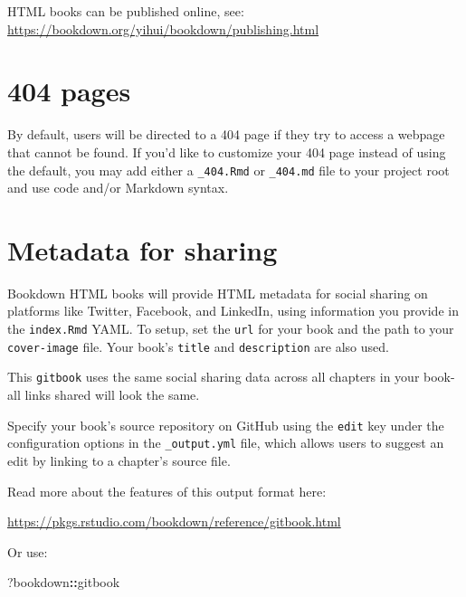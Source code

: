 \documentclass[
]{book}
\newenvironment{Shaded}{\begin{snugshade}}{\end{snugshade}}
\newcommand{\NormalTok}[1]{#1}
\newcommand{\SpecialCharTok}[1]{\textcolor[rgb]{0.81,0.36,0.00}{\textbf{#1}}}
\theoremstyle{definition}
\theoremstyle{definition}
\theoremstyle{definition}
\theoremstyle{definition}
\theoremstyle{remark}
\begin{document}
HTML books can be published online, see: \url{https://bookdown.org/yihui/bookdown/publishing.html}

\section{404 pages}\label{pages}

By default, users will be directed to a 404 page if they try to access a webpage that cannot be found. If you'd like to customize your 404 page instead of using the default, you may add either a \texttt{\_404.Rmd} or \texttt{\_404.md} file to your project root and use code and/or Markdown syntax.

\section{Metadata for sharing}\label{metadata-for-sharing}

Bookdown HTML books will provide HTML metadata for social sharing on platforms like Twitter, Facebook, and LinkedIn, using information you provide in the \texttt{index.Rmd} YAML. To setup, set the \texttt{url} for your book and the path to your \texttt{cover-image} file. Your book's \texttt{title} and \texttt{description} are also used.

This \texttt{gitbook} uses the same social sharing data across all chapters in your book- all links shared will look the same.

Specify your book's source repository on GitHub using the \texttt{edit} key under the configuration options in the \texttt{\_output.yml} file, which allows users to suggest an edit by linking to a chapter's source file.

Read more about the features of this output format here:

\url{https://pkgs.rstudio.com/bookdown/reference/gitbook.html}

Or use:

\begin{Shaded}
\begin{Highlighting}[]
\NormalTok{?bookdown}\SpecialCharTok{::}\NormalTok{gitbook}
\end{Highlighting}
\end{Shaded}



\end{document}
